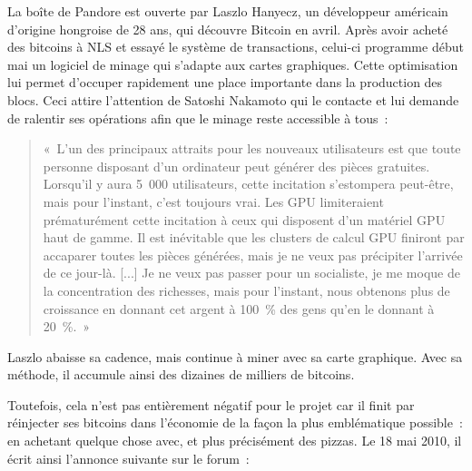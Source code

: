 La boîte de Pandore est ouverte par Laszlo Hanyecz, un développeur américain d'origine hongroise de 28 ans, qui découvre Bitcoin en avril. Après avoir acheté des bitcoins à NLS et essayé le système de transactions, celui-ci programme début mai un logiciel de minage qui s'adapte aux cartes graphiques. Cette optimisation lui permet d'occuper rapidement une place importante dans la production des blocs. Ceci attire l'attention de Satoshi Nakamoto qui le contacte et lui demande de ralentir ses opérations afin que le minage reste accessible à tous~:

\begin{quote}
«~L'un des principaux attraits pour les nouveaux utilisateurs est que toute personne disposant d'un ordinateur peut générer des pièces gratuites. Lorsqu'il y aura 5~000 utilisateurs, cette incitation s'estompera peut-être, mais pour l'instant, c'est toujours vrai. Les GPU limiteraient prématurément cette incitation à ceux qui disposent d'un matériel GPU haut de gamme. Il est inévitable que les clusters de calcul GPU finiront par accaparer toutes les pièces générées, mais je ne veux pas précipiter l'arrivée de ce jour-là. [...] Je ne veux pas passer pour un socialiste, je me moque de la concentration des richesses, mais pour l'instant, nous obtenons plus de croissance en donnant cet argent à 100~\% des gens qu'en le donnant à 20~\%.~»
\end{quote}

Laszlo abaisse sa cadence, mais continue à miner avec sa carte graphique. Avec sa méthode, il accumule ainsi des dizaines de milliers de bitcoins.

Toutefois, cela n'est pas entièrement négatif pour le projet car il finit par réinjecter ses bitcoins dans l'économie de la façon la plus emblématique possible~: en achetant quelque chose avec, et plus précisément des pizzas. Le 18 mai 2010, il écrit ainsi l'annonce suivante sur le forum~:

